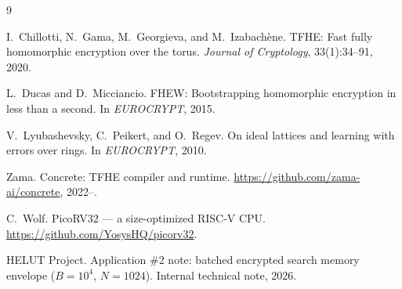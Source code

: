 \documentclass[11pt,a4paper]{article}
\begin{document}
\begin{thebibliography}{9}

I.~Chillotti, N.~Gama, M.~Georgieva, and M.~Izabach{\`e}ne.
\newblock TFHE: Fast fully homomorphic encryption over the torus.
\newblock \emph{Journal of Cryptology}, 33(1):34--91, 2020.

L.~Ducas and D.~Micciancio.
\newblock FHEW: Bootstrapping homomorphic encryption in less than a second.
\newblock In \emph{EUROCRYPT}, 2015.

V.~Lyubashevsky, C.~Peikert, and O.~Regev.
\newblock On ideal lattices and learning with errors over rings.
\newblock In \emph{EUROCRYPT}, 2010.

Zama.
\newblock Concrete: TFHE compiler and runtime.
\newblock \url{https://github.com/zama-ai/concrete}, 2022--.

C.~Wolf.
\newblock PicoRV32 --- a size-optimized RISC-V CPU.
\newblock \url{https://github.com/YosysHQ/picorv32}.

HELUT Project.
\newblock Application \#2 note: batched encrypted search memory envelope
($B{=}10^{4}$, $N{=}1024$).
\newblock Internal technical note, 2026.

\end{thebibliography}
\end{document}
